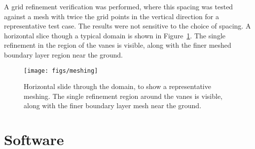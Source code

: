 A grid refinement verification was performed, where this spacing was 
tested against a mesh with twice the grid points in the vertical
direction for a representative test case. The results were not sensitive
to the choice of spacing. A horizontal slice though a
typical domain is shown in Figure~\ref{fig:meshing}. The single 
refinement in the region of the vanes is visible, along with the finer 
meshed boundary layer region near the ground. 

  \begin{figure}[!htb]
    \begin{center}
     \texttt{[image: figs/meshing]}
     \caption{Horizontal slide through the domain, to show a
     representative meshing. The single refinement region around the
     vanes is visible, along with the finer boundary layer mesh near the
     ground.}
     \label{fig:meshing}
    \end{center}
  \end{figure}


%



\section{Software}

